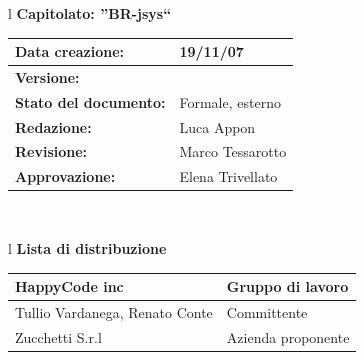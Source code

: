 \documentclass[11pt,titlepage,a4paper]{report}
\begin{document}
\begin{center}
\thispagestyle{plain}
\begin{table}[htbp]
\large{
\begin{tabular}{l}
\Large{\textbf{\textsf{Capitolato: ''BR-jsys``}}} \\
\begin{tabular}{||p{6cm}||p{6cm}||} \hline
\textbf{Data creazione:} & 19/11/07 \\ \hline
\textbf{Versione:} & \lv \\ \hline
\textbf{Stato del documento:} & Formale, esterno \\ \hline
\textbf{Redazione:} & Luca Appon \\ \hline
\textbf{Revisione:} & Marco Tessarotto   \\ \hline
\textbf{Approvazione:}  & Elena Trivellato\\ \hline
\end{tabular} \\
\end{tabular}
}
\end{table}

\begin{table}[hbtp]
\large{
\begin{tabular}{l}
\Large{\textbf{\textsf{Lista di distribuzione}}} \\
\begin{tabular}{||p{6cm}||p{6cm}||} \hline
{HappyCode inc}& Gruppo di lavoro\\ \hline
{Tullio Vardanega, Renato Conte}& Committente \\ \hline
{Zucchetti S.r.l}& Azienda proponente\\ \hline
\end{tabular} \\
\end{tabular}
}
\end{table}


\end{center}
\end{document}
